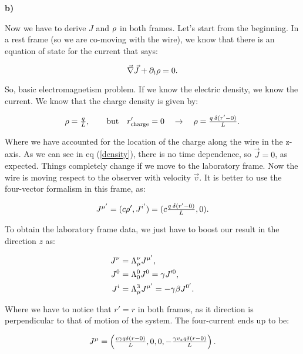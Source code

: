\textbf{b)}

Now we have to derive $J$ and $\rho$ in both frames. Let's start from the beginning. In a rest frame (so we are co-moving with the wire), we know that there is an equation of state for the current that says:

\begin{equation}
	\vec{\nabla}\vec{J} + \partial_{t} \rho=0.
\end{equation}

So, basic electromagnetism problem. If we know the electric density, we know the current. We know that the charge density is given by:

\begin{equation}\label{density}
	\rho  = \tfrac{q}{L} , \quad \quad \text{but}\quad  r'_{\text{charge}} = 0 \quad \rightarrow \quad \rho =  \tfrac{q \: \delta (r'-0)}{ L }.
\end{equation}

Where we have accounted for the location of the charge along the wire in the z-axis. As we can see in eq (\ref{density}), there is no time dependence, so $\vec{J} = 0$, as expected. Things completely change if we move to the laboratory frame. Now the wire is moving respect to the observer with velocity $\vec{v}$. It is better to use the four-vector formalism in this frame, as:

\begin{equation}
	J^{\mu' }=(c \rho', J^{i' }) =  (c \tfrac{q \: \delta (r'-0)}{L },0).
\end{equation}

To obtain the laboratory frame data, we just have to boost our result in the direction $z$ as:

\begin{equation}
	\begin{split}
		J^{\nu } &= \Lambda^{\nu}_{\mu} J^{\mu' },\\
		J^{0 } &= \Lambda^{0}_{0} J^{0 } = \gamma J'^{0},\\
		J^{i } &= \Lambda^{3}_{\mu} J^{\mu' } = -\gamma \beta J^{0' }.   
	\end{split}
\end{equation}

Where we have to notice that $r' = r$ in both frames, as it direction is perpendicular to that of motion of the system. The four-current ends up to be:

\begin{equation}
	J^{\mu } = \left( \tfrac{ c\gamma q \delta (r-0)}{ L}, 0,0, -\tfrac{\gamma v_{z} q \delta (r-0)}{L}\right).
\end{equation}

